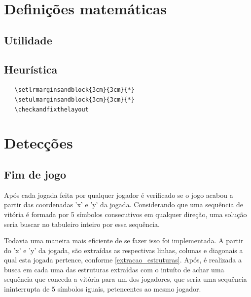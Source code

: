 \documentclass[
	article,			%
	11pt,				%
	oneside,			%
	a4paper,			%
	english,			%
	brazil,				%
	sumario=tradicional
	]{abntex2}
\begin{document}
\section{Definições matemáticas}

\subsection{Utilidade}
\subsection{Heurística}


\begin{verbatim}
   \setlrmarginsandblock{3cm}{3cm}{*}
   \setulmarginsandblock{3cm}{3cm}{*}
   \checkandfixthelayout
\end{verbatim}

\section{Detecções}

\subsection{Fim de jogo}

Após cada jogada feita por qualquer jogador é verificado se o jogo acabou
a partir das coordenadas 'x' e 'y' da jogada. Considerando que uma sequência de vitória é formada
por 5 símbolos consecutivos em qualquer direção, uma solução seria buscar no tabuleiro inteiro por
essa sequência.

Todavia uma maneira mais eficiente de se fazer isso foi implementada. A partir do 'x' e 'y' da jogada, são extraídas as respectivas linhas, colunas e diagonais a qual esta jogada pertence, conforme \autoref{extracao_estruturas}. Após, é realizada a busca em cada uma das estruturas extraídas com o intuíto de achar uma sequência que conceda a vitória para um dos jogadores, que seria uma sequência ininterrupta de 5 símbolos iguais, petencentes ao mesmo jogador.
\end{document}

